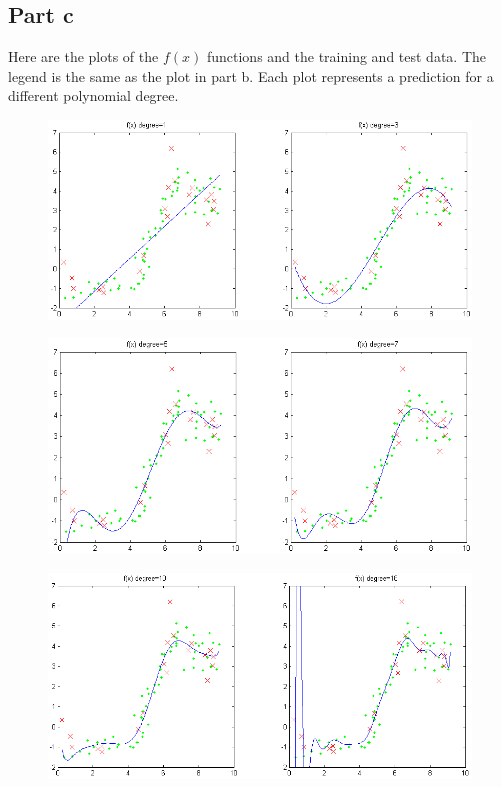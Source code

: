 \documentclass[twoside,11pt]{article}
\theoremstyle{definition}
\begin{document}
\newpage

\subsection*{Part c}


Here are the plots of the $f(x)$ functions and the training and test data. The legend is the same as the plot in part b. Each plot represents a prediction for a different polynomial degree.\\
\begin{figure}[h]
\centering
\includegraphics[width=\columnwidth]{prob1cPlotA1.png}
\end{figure}
\begin{figure}[h]
\centering
\includegraphics[width=\columnwidth]{prob1cPlotA2.png}
\end{figure}

\newpage

\begin{figure}[h]
\centering
\includegraphics[width=\columnwidth]{prob1cPlotA3.png}
\end{figure}
\end{document}
